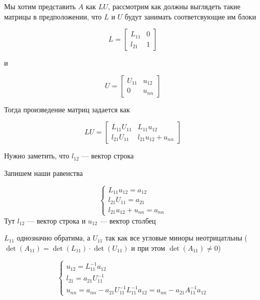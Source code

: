 \documentclass{article}
\begin{document}
    Мы хотим представить $A$ как $LU$, рассмотрим как должны 
    выглядеть такие матрицы в предположении, что $L$ и $U$ будут занимать соответсвующие им блоки  

    \begin{equation}
        L = \begin{bmatrix}
            L_{11} & 0 \\
            l_{21} & 1
        \end{bmatrix}
    \end{equation}

    и 

    \begin{equation}
        U = \begin{bmatrix}
            U_{11} & u_{12} \\ 
            0 & u_{nn}
        \end{bmatrix}
    \end{equation}

    Тогда произведение матриц задается как 

    \begin{equation}
        LU = \begin{bmatrix}
            L_{11} U_{11} & L_{11} u_{12} \\ 
            l_{21} U_{11} & l_{21} u_{12} + u_{nn}
        \end{bmatrix}
    \end{equation}

    Нужно заметить, что $l_{12}$ --- вектор строка

    \quad

    Запишем наши равенства 

    \[
    \begin{cases}
    L_{11} u_{12} = a_{12} \\
    l_{21} U_{11} = a_{21} \\
    l_{21} u_{12} + u_{nn} = a_{nn}
    \end{cases}
    \]
    Тут $l_{12}$ --- вектор строка и $u_{12}$ --- вектор столбец

    \quad

    $L_{11}$ однозначно обратима, а $U_{11}$ так как все угловые миноры неотрицатльны ($\det(A_{11}) = \det(L_{11}) \cdot \det(U_{11})$
    и при этом $\det(A_{11}) \neq 0$)

    \[
    \begin{cases}
    u_{12} = L_{11}^{-1} a_{12} \\
    l_{21} = a_{21} U_{11}^{-1} \\
    u_{nn} = a_{nn} - a_{21} U_{11}^{-1}L_{11}^{-1} a_{12} = a_{nn} - a_{21} A_{11}^{-1} a_{12} 
    \end{cases}
    \]
\end{document}
